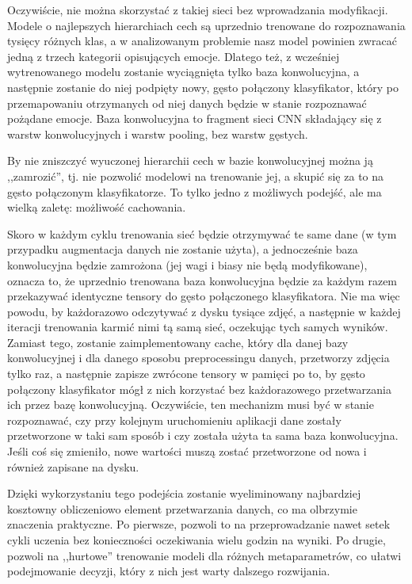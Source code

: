 Oczywiście, nie można skorzystać z takiej sieci bez wprowadzania modyfikacji. Modele o najlepszych hierarchiach cech są uprzednio trenowane do rozpoznawania tysięcy różnych klas, a w analizowanym problemie nasz model powinien zwracać jedną z trzech kategorii opisujących emocje. Dlatego też, z wcześniej wytrenowanego modelu zostanie wyciągnięta tylko baza konwolucyjna, a następnie zostanie do niej podpięty nowy, gęsto połączony klasyfikator, który po przemapowaniu otrzymanych od niej danych będzie w stanie rozpoznawać pożądane emocje. Baza konwolucyjna to fragment sieci CNN składający się z warstw konwolucyjnych i warstw pooling, bez warstw gęstych.

By nie zniszczyć wyuczonej hierarchii cech w bazie konwolucyjnej można ją ,,zamrozić'', tj. nie pozwolić modelowi na trenowanie jej, a skupić się za to na gęsto połączonym klasyfikatorze. To tylko jedno z możliwych podejść, ale ma wielką zaletę: możliwość cachowania.

Skoro w każdym cyklu trenowania sieć będzie otrzymywać te same dane (w tym przypadku augmentacja danych nie zostanie użyta), a jednocześnie baza konwolucyjna będzie zamrożona (jej wagi i biasy nie będą modyfikowane), oznacza to, że uprzednio trenowana baza konwolucyjna będzie za każdym razem przekazywać identyczne tensory do gęsto połączonego klasyfikatora. Nie ma więc powodu, by każdorazowo odczytywać z dysku tysiące zdjęć, a następnie w każdej iteracji trenowania karmić nimi tą samą sieć, oczekując tych samych wyników. Zamiast tego, zostanie zaimplementowany cache, który dla danej bazy konwolucyjnej i dla danego sposobu preprocessingu danych, przetworzy zdjęcia tylko raz, a następnie zapisze zwrócone tensory w pamięci po to, by gęsto połączony klasyfikator mógł z nich korzystać bez każdorazowego przetwarzania ich przez bazę konwolucyjną. Oczywiście, ten mechanizm musi być w stanie rozpoznawać, czy przy kolejnym uruchomieniu aplikacji dane zostały przetworzone w taki sam sposób i czy została użyta ta sama baza konwolucyjna. Jeśli coś się zmieniło, nowe wartości muszą zostać przetworzone od nowa i również zapisane na dysku.

Dzięki wykorzystaniu tego podejścia zostanie wyeliminowany najbardziej kosztowny obliczeniowo element przetwarzania danych, co ma olbrzymie znaczenia praktyczne. Po pierwsze, pozwoli to na przeprowadzanie nawet setek cykli uczenia bez konieczności oczekiwania wielu godzin na wyniki. Po drugie, pozwoli na ,,hurtowe'' trenowanie modeli dla różnych metaparametrów, co ułatwi podejmowanie decyzji, który z nich jest warty dalszego rozwijania.


